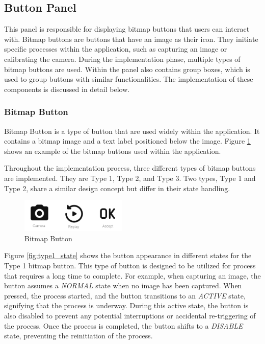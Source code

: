 \subsection{Button Panel}
\label{subsec:button_panel}

This panel is responsible for displaying bitmap buttons that users can interact with. Bitmap buttons are buttons that have an image as their icon. They initiate specific processes within the application, such as capturing an image or calibrating the camera. During the implementation phase, multiple types of bitmap buttons are used. Within the panel also contains group boxes, which is used to group buttons with similar functionalities. The implementation of these components is discussed in detail below.

\subsubsection{Bitmap Button}
Bitmap Button is a type of button that are used widely within the application. It contains a bitmap image and a text label positioned below the image. Figure \ref{fig:bitmap_button} shows an example of the bitmap buttons used within the application.

Throughout the implementation process, three different types of
bitmap buttons are implemented. They are Type 1, Type 2, and Type 3. Two types, Type 1 and Type 2, share a similar design concept but differ in their state handling.

\begin{figure}[!ht]
    \centering
    \includegraphics[width=0.45\textwidth]{texs/Part2/chapter4/image/bitmapbutton.png}
    \caption{Bitmap Button}
    \label{fig:bitmap_button}
\end{figure}

Figure \ref{fig:type1_state} shows the button appearance in different states for the Type 1 bitmap button. This type of button is designed to be utilized for process that requires a long time to complete. For example, when capturing an image, the button assumes a \textit{NORMAL} state when no image has been captured. When pressed, the process started, and the button transitions to an \textit{ACTIVE} state, signifying that the process is underway. During this active state, the button is also disabled to prevent any potential interruptions or accidental re-triggering of the process. Once the process is completed, the button shifts to a \textit{DISABLE} state, preventing the reinitiation of the process.

